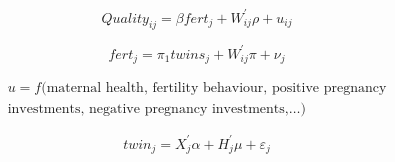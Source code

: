 
\begin{equation}
\label{TWINeqn:secondstage}
Quality_{ij}=\beta fert_{j} + W_{ij}^\prime\rho+u_{ij}
\end{equation}

\begin{equation}
\label{TWINeqn:firststage}
fert_{j}=\pi_1 twins_{j}+W_{ij}^\prime\pi+\nu_{j}
\end{equation}




\begin{equation}
\label{TWINeqn:IVbias}
\begin{split}
u=f(\text{maternal health, fertility behaviour, positive pregnancy}  \\
\text{investments, negative pregnancy investments,}\ldots)
\end{split}
\end{equation}


\begin{equation}
\label{TWINeqn:twinreg}
twin_{j}=X_j^\prime\alpha + H_j^\prime\mu +\varepsilon_{j}
\end{equation}
